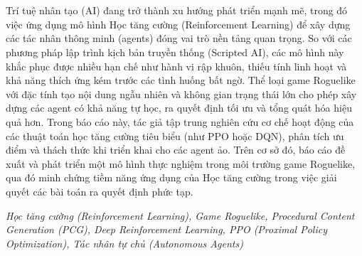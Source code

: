 \clearpage
{}

\chapter*{\fontsize{13}{13}\selectfont{Tóm tắt}}

Trí tuệ nhân tạo (AI) đang trở thành xu hướng phát triển mạnh mẽ, trong đó việc ứng dụng mô hình Học tăng cường (Reinforcement Learning) để xây dựng các tác nhân thông minh (agents) đóng vai trò nền tảng quan trọng. So với các phương pháp lập trình kịch bản truyền thống (Scripted AI), các mô hình này khắc phục được nhiều hạn chế như hành vi rập khuôn, thiếu tính linh hoạt và khả năng thích ứng kém trước các tình huống bất ngờ. Thể loại game Roguelike với đặc tính tạo nội dung ngẫu nhiên và không gian trạng thái lớn cho phép xây dựng các agent có khả năng tự học, ra quyết định tối ưu và tổng quát hóa hiệu quả hơn. Trong báo cáo này, tác giả tập trung nghiên cứu cơ chế hoạt động của các thuật toán học tăng cường tiêu biểu (như PPO hoặc DQN), phân tích ưu điểm và thách thức khi triển khai cho các agent ảo. Trên cơ sở đó, báo cáo đề xuất và phát triển một mô hình thực nghiệm trong môi trường game Roguelike, qua đó minh chứng tiềm năng ứng dụng của Học tăng cường trong việc giải quyết các bài toán ra quyết định phức tạp.

\vspace{0.5cm}
 \textit{Học tăng cường (Reinforcement Learning), Game Roguelike, Procedural Content Generation (PCG), Deep Reinforcement Learning, PPO (Proximal Policy Optimization), Tác nhân tự chủ (Autonomous Agents)}